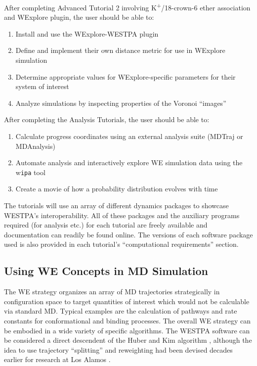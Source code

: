 \documentclass[9pt,tutorial,ASAPversion]{livecoms}
\begin{document}
After completing Advanced Tutorial 2 involving K\textsuperscript{+}/18-crown-6 ether association and WExplore plugin, the user should be able to:
\begin{enumerate}
\item Install and use the WExplore-WESTPA plugin
\item Define and implement their own distance metric for use in WExplore simulation
\item Determine appropriate values for WExplore-specific parameters for their system of interest
\item Analyze simulations by inspecting properties of the Voronoi “images” 
\end{enumerate}

After completing the Analysis Tutorials, the user should be able to:
\begin{enumerate}
\item Calculate progress coordinates using an external analysis suite (MDTraj or MDAnalysis)
\item Automate analysis and interactively explore WE simulation data using the w\textunderscore \verb|ipa| tool
\item Create a movie of how a probability distribution evolves with time
\end{enumerate}

The tutorials will use an array of different dynamics packages to showcase WESTPA’s interoperability. All of these packages and the auxiliary programs required (for analysis etc.) for each tutorial are freely available and documentation can readily be found online.  The versions of each software package used is also provided in each tutorial’s “computational requirements” section. 

\subsection{Using WE Concepts in MD Simulation}

The WE strategy organizes an array of MD trajectories strategically in configuration space to target quantities of interest which would not be calculable via standard MD. 
Typical examples are the calculation of pathways and rate constants for conformational and binding processes. 
The overall WE strategy can be embodied in a wide variety of specific algorithms. 
The WESTPA software can be considered a direct descendent of the Huber and Kim algorithm \citep{HuberKim1996}, although the idea to use trajectory “splitting” and reweighting had been devised decades earlier for research at Los Alamos \citep{KahnHarris1951}.  
\end{document}
